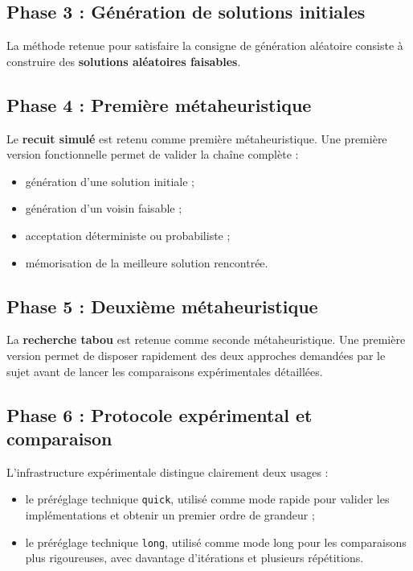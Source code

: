 \documentclass[11pt,a4paper]{article}
\newcommand{\og}{%
  \ifmmode\langle\else\guillemotleft\nobreak\fi}
\newcommand{\fg}{%
  \ifmmode\rangle\else\nobreak\guillemotright\fi}
\begin{document}
\subsection{Phase 3 : Génération de solutions initiales}
La méthode retenue pour satisfaire la consigne de génération aléatoire consiste à construire des \textbf{solutions aléatoires faisables}.

\subsection{Phase 4 : Première métaheuristique}
Le \textbf{recuit simulé} est retenu comme première métaheuristique. Une première version fonctionnelle permet de valider la chaîne complète :
\begin{itemize}
    \item génération d'une solution initiale ;
    \item génération d'un voisin faisable ;
    \item acceptation déterministe ou probabiliste ;
    \item mémorisation de la meilleure solution rencontrée.
\end{itemize}

\subsection{Phase 5 : Deuxième métaheuristique}
La \textbf{recherche tabou} est retenue comme seconde métaheuristique. Une première version permet de disposer rapidement des deux approches demandées par le sujet avant de lancer les comparaisons expérimentales détaillées.

\subsection{Phase 6 : Protocole expérimental et comparaison}
L'infrastructure expérimentale distingue clairement deux usages :
\begin{itemize}
    \item le préréglage technique \texttt{quick}, utilisé comme \og mode rapide \fg{} pour valider les implémentations et obtenir un premier ordre de grandeur ;
    \item le préréglage technique \texttt{long}, utilisé comme \og mode long \fg{} pour les comparaisons plus rigoureuses, avec davantage d'itérations et plusieurs répétitions.
\end{itemize}

\end{document}
